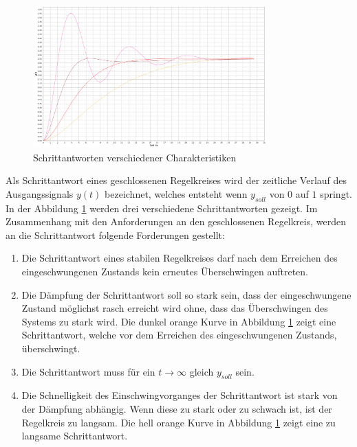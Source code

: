 \begin{figure}[h!, width=\pagewidth]
    \begin{center}
    \includegraphics[width=0.8\textwidth]{images/schrittantworten.png}
    \caption{Schrittantworten verschiedener Charakteristiken}
    \label{fig:stepresponse}
    \end{center}
\end{figure}

Als Schrittantwort eines geschlossenen Regelkreises wird der zeitliche Verlauf
des Ausgangssignals  $y(t)$ bezeichnet,  welches entsteht wenn  $y_{soll}$ von
$0$  auf  $1$ springt. In  der  Abbildung  \ref{fig:stepresponse} werden  drei
verschiedene Schrittantworten gezeigt.  Im  Zusammenhang mit den Anforderungen
an  den  geschlossenen  Regelkreis,  werden  an  die  Schrittantwort  folgende
Forderungen gestellt:

\begin{enumerate}
    \item
        Die Schrittantwort eines stabilen Regelkreises darf nach dem Erreichen
        des eingeschwungenen Zustands kein erneutes \"Uberschwingen auftreten.
    \item
        Die  D\"ampfung  der  Schrittantwort  soll so  stark  sein,  dass  der
        eingeschwungene Zustand m\"oglichst rasch erreicht wird ohne, dass das
        \"Uberschwingen des Systems zu stark  wird. Die dunkel orange Kurve in
        Abbildung \ref{fig:stepresponse} zeigt eine Schrittantwort, welche vor
        dem Erreichen des eingeschwungenen Zustands, \"uberschwingt.
    \item
        Die   Schrittantwort  muss   f\"ur  ein   $t\rightarrow\infty$  gleich
        $y_{soll}$ sein.
    \item
        Die Schnelligkeit des Einschwingvorganges der Schrittantwort ist stark
        von der  D\"ampfung abh\"angig. Wenn  diese zu  stark oder  zu schwach
        ist, ist der Regelkreis zu langsam. Die hell orange Kurve in Abbildung
        \ref{fig:stepresponse} zeigt eine zu langsame Schrittantwort.
\end{enumerate}

